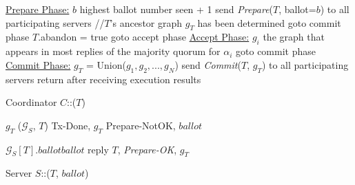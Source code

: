 \begin{algorithm}[h]
  \DontPrintSemicolon
  \underline{Prepare Phase:} \;
  $b$ {\LAR} highest ballot number seen + 1\;
  send \emph{Prepare}($T$, ballot=$b$) to all participating servers\;
   {
	  //$T$'s ancestor graph $g_{T}$ has been determined\;
	  goto commit phase\;
  }  {
       {
	    $T$.abandon = true\;
	  } %
	  goto accept phase\;
  } 
  \underline{Accept Phase:} \;
   {
	  $g_i$ \LAR the graph that appears in most replies of the majority quorum for $\alpha_i$\;
  }
   {
      goto commit phase
  } 
  \underline{Commit Phase:} \;
  $g_{T}$ = Union($g_1, g_2, ..., g_N$) \;
  send {\em Commit}($T$, $g_{T}$) to all participating servers \;
  return after receiving execution results \;
  \caption{Coordinator $C$::($T$)}
  \label{alg:recovery}
\end{algorithm}


\begin{algorithm}[h]
  \DontPrintSemicolon
  $g_T$ ($\mathcal{G}_S$, $T$)\;
   {
	  \Return Tx-Done, $g_T$\;
  } {
	  \Return Prepare-NotOK, $ballot$\;
  }
  
  $\mathcal{G}_S[T].ballot$\LAR$ballot$ \;
  reply $T$, \emph{Prepare-OK}, $g_T$ \;
  \caption{Server $S$::($T$, $ballot$)}
  \label{alg:prepare}
\end{algorithm}



